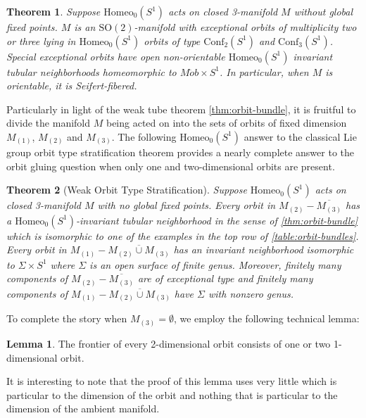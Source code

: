 \documentclass[10pt, oneside]{article}
\newcommand{\SO}[1][2]{\text{SO}(#1)}
\newcommand{\homeo}[1][S^1]{\text{Homeo}_0(#1)}
\newcommand{\cl}[1]{\overline{#1}}
\newcommand{\conf}[2][S^1]{\text{Conf}_{#2}(#1)}
\newtheorem{thm}{Theorem}[section]
\theoremstyle{definition}
\newtheorem{rem}{Remark}[section]
\newtheorem{lem}{Lemma}[section]
\theoremstyle{definition}
\begin{document}
\begin{thm}\label{thm:3mfld-global-top}
    Suppose $\homeo$ acts on closed 3-manifold $M$ without global fixed points. $M$ is an $\SO[2]$-manifold with exceptional orbits of multiplicity two or three lying in $\homeo$ orbits of type $\conf[S^1]{2}$ and $\conf[S^1]{3}$. Special exceptional orbits have open non-orientable $\homeo$ invariant tubular neighborhoods homeomorphic to $M\ddot{o}b\times S^1$. In particular, when $M$ is orientable, it is Seifert-fibered.
\end{thm}

Particularly in light of the weak tube theorem \cref{thm:orbit-bundle}, it is fruitful to divide the manifold $M$ being acted on into the sets of orbits of fixed dimension $M_{(1)}$, $M_{(2)}$ and $M_{(3)}$. The following $\homeo$ answer to the classical Lie group orbit type stratification theorem provides a nearly complete answer to the orbit gluing question when only one and two-dimensional orbits are present.

\begin{thm}[Weak Orbit Type Stratification]\label{thm:weak-o-t-strat}
    Suppose $\homeo$ acts on closed 3-manifold $M$ with no global fixed points. Every orbit in $M_{(2)} - \cl{M_{(3)}}$ has a $\homeo$-invariant tubular neighborhood in the sense of \cref{thm:orbit-bundle} which is isomorphic to one of the examples in the top row of \cref{table:orbit-bundles}. Every orbit in $M_{(1)} - \cl{M_{(2)}\cup M_{(3)}}$ has an invariant neighborhood isomorphic to $\Sigma \times S^1$ where $\Sigma$ is an open surface of finite genus. Moreover, finitely many components of $M_{(2)} - \cl{M_{(3)}}$ are of exceptional type and finitely many components of $M_{(1)} - \cl{M_{(2)}\cup M_{(3)}}$ have $\Sigma$ with nonzero genus.
\end{thm}

To complete the story when $M_{(3)}=\emptyset$, we employ the following technical lemma:
\begin{lem}
    The frontier of every 2-dimensional orbit consists of one or two 1-dimensional orbit.
\end{lem}
It is interesting to note that the proof of this lemma uses very little which is particular to the dimension of the orbit and nothing that is particular to the dimension of the ambient manifold.

\end{document}
